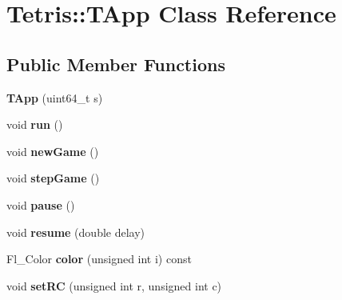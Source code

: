 \hypertarget{class_tetris_1_1_t_app}{\section{Tetris\-:\-:T\-App Class Reference}
\label{class_tetris_1_1_t_app}
}
\subsection*{Public Member Functions}
\begin{DoxyCompactItemize}
\item 
\hypertarget{class_tetris_1_1_t_app_a318e10428622a7d949cbb497ef0186a3}{{\bfseries T\-App} (uint64\-\_\-t s)}\label{class_tetris_1_1_t_app_a318e10428622a7d949cbb497ef0186a3}

\item 
\hypertarget{class_tetris_1_1_t_app_a7fb80778823576796323568e0280ff8b}{void {\bfseries run} ()}\label{class_tetris_1_1_t_app_a7fb80778823576796323568e0280ff8b}

\item 
\hypertarget{class_tetris_1_1_t_app_a364fa1df216c28a7434acdbd98409b01}{void {\bfseries new\-Game} ()}\label{class_tetris_1_1_t_app_a364fa1df216c28a7434acdbd98409b01}

\item 
\hypertarget{class_tetris_1_1_t_app_aabca7af9c8e9f50e51222baacb4fc9a4}{void {\bfseries step\-Game} ()}\label{class_tetris_1_1_t_app_aabca7af9c8e9f50e51222baacb4fc9a4}

\item 
\hypertarget{class_tetris_1_1_t_app_a520fc81cbd8b64544fb2cbad9b9e39dd}{void {\bfseries pause} ()}\label{class_tetris_1_1_t_app_a520fc81cbd8b64544fb2cbad9b9e39dd}

\item 
\hypertarget{class_tetris_1_1_t_app_aeb17f1d5b84170d9529fa936f81941da}{void {\bfseries resume} (double delay)}\label{class_tetris_1_1_t_app_aeb17f1d5b84170d9529fa936f81941da}

\item 
\hypertarget{class_tetris_1_1_t_app_ae903c8a96a48c80e33015698f27f3fee}{Fl\-\_\-\-Color {\bfseries color} (unsigned int i) const }\label{class_tetris_1_1_t_app_ae903c8a96a48c80e33015698f27f3fee}

\item 
\hypertarget{class_tetris_1_1_t_app_afd4e1a6f04b9b40d8c4305bbb3cea388}{void {\bfseries set\-R\-C} (unsigned int r, unsigned int c)}\label{class_tetris_1_1_t_app_afd4e1a6f04b9b40d8c4305bbb3cea388}


\end{DoxyCompactItemize}
